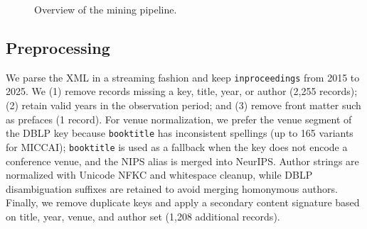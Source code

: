 ﻿\documentclass[conference]{IEEEtran}
\begin{document}
\begin{figure}[t]
\centering
{}
\caption{Overview of the mining pipeline.}
\label{fig:pipeline}
\end{figure}

\subsection{Preprocessing}
We parse the XML in a streaming fashion and keep \texttt{inproceedings} from 2015 to 2025. We (1) remove records missing a key, title, year, or author (2,255 records); (2) retain valid years in the observation period; and (3) remove front matter such as prefaces (1 record). For venue normalization, we prefer the venue segment of the DBLP key because \texttt{booktitle} has inconsistent spellings (up to 165 variants for MICCAI); \texttt{booktitle} is used as a fallback when the key does not encode a conference venue, and the NIPS alias is merged into NeurIPS. Author strings are normalized with Unicode NFKC and whitespace cleanup, while DBLP disambiguation suffixes are retained to avoid merging homonymous authors. Finally, we remove duplicate keys and apply a secondary content signature based on title, year, venue, and author set (1,208 additional records).
\end{document}
